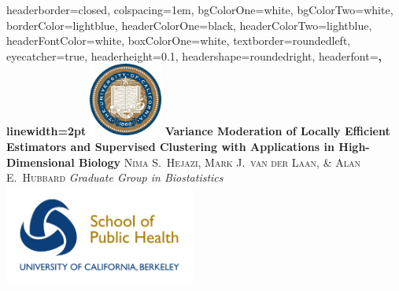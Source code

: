 \documentclass[landscape,a0paper,fontscale=0.285]{baposter} %
\newcommand{\1}{\mathbbm{1}}
\begin{document}
\begin{poster}
{
headerborder=closed, %
colspacing=1em, %
bgColorOne=white, %
bgColorTwo=white, %
borderColor=lightblue, %
headerColorOne=black, %
headerColorTwo=lightblue, %
headerFontColor=white, %
boxColorOne=white, %
textborder=roundedleft, %
eyecatcher=true, %
headerheight=0.1\textheight, %
headershape=roundedright, %
headerfont=\Large\bf\textsc, %
linewidth=2pt %
}
%
{\includegraphics[height=6.5em]{logo_cal.jpg}} %
{\textbf{\LARGE Variance Moderation of Locally Efficient Estimators and
    Supervised Clustering with Applications in High-Dimensional
    Biology\vspace{0.5em}}} %
{\textsc{Nima S.~Hejazi, Mark J.~van der Laan, \& Alan E.~Hubbard} \hspace{12pt}
  \textit{Graduate Group in Biostatistics}} %
{\includegraphics[height=9em]{logo_sph.jpg}} %


\end{poster}
\end{document}
